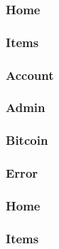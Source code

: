 \documentclass[11pt]{article} %
\begin{document}
\subsubsection*{Home}
\subsubsection*{Items}
\subsubsection*{Account}
\subsubsection*{Admin}
\subsubsection*{Bitcoin}
\subsubsection*{Error}
\subsubsection*{Home}
\subsubsection*{Items}
\end{document}
